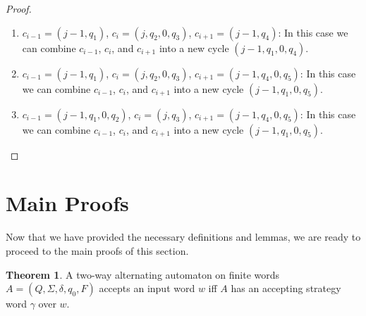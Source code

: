 \documentclass{lmcs}
\theoremstyle{definition}
\newtheorem{theorem}[thm]{Theorem}
\DeclareMathOperator{\?}{?}
\begin{document}
\begin{proof}
\begin{enumerate}
\item
$c_{i-1}=(j-1,q_1)$, $c_i=(j,q_2,0,q_3)$, $c_{i+1}=(j-1,q_4)$:
In this case we can combine $c_{i-1}$, $c_i$, and $c_{i+1}$ into a new cycle $(j-1,q_1,0,q_4)$.

\item
$c_{i-1}=(j-1,q_1)$, $c_i=(j,q_2,0,q_3)$, $c_{i+1}=(j-1,q_4,0,q_5)$:
In this case we can combine $c_{i-1}$, $c_i$, and $c_{i+1}$ into a new cycle $(j-1,q_1,0,q_5)$.

\item
$c_{i-1}=(j-1,q_1,0,q_2)$, $c_i=(j,q_3)$, $c_{i+1}=(j-1,q_4,0,q_5)$:
In this case we can combine $c_{i-1}$, $c_i$, and $c_{i+1}$ into a new cycle $(j-1,q_1,0,q_5)$. \qedhere


 \end{enumerate}
\end{proof}


\section{Main Proofs}

Now that we have provided the necessary definitions and lemmas, we are ready to proceed to the main proofs of this section.

\begin{theorem}
    A two-way alternating automaton on finite words $A = (Q, \Sigma, \delta, q_0, F)$
    accepts an input word $w$ iff $A$ has an accepting strategy word $\gamma$ over $w$.
\end{theorem}
\end{document}
